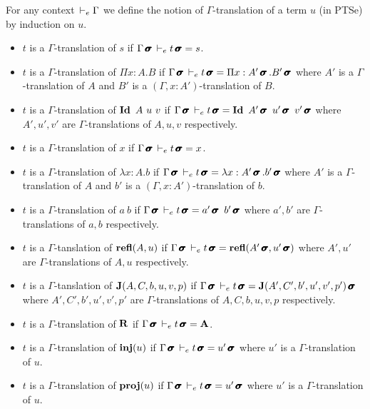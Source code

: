 \documentclass[a4paper,english]{lipics-utf8x}
\begin{document}
  \begin{definition}
    For any context $\,\vdash_e \Gamma$ we define the notion of $\Gamma$-translation
    of a term $u$ (in PTSe) by induction on $u$.
    \begin{itemize}
      \item $t$ is a $\Gamma$-translation of $s$ if
            $\Gamma \operatorname{\pmb{\bm{\sigma}}} \,\vdash_e t \operatorname{\pmb{\bm{\sigma}}} = s$.
      \item $t$ is a $\Gamma$-translation of $\Pi x:A.B$ if
            $\Gamma \operatorname{\pmb{\bm{\sigma}}} \,\vdash_e t \operatorname{\pmb{\bm{\sigma}}} = \Pi x:A'\operatorname{\pmb{\bm{\sigma}}}.B'\operatorname{\pmb{\bm{\sigma}}}$ where
            $A'$ is a $\Gamma$-translation of $A$ and $B'$ is a
            $(\Gamma, x:A')$-translation of $B$.
      \item $t$ is a $\Gamma$-translation of $\operatorname{\mathbf{Id}~} A\ u\ v$ if
            $\Gamma \msigma \dere t \msigma = \Id A'\msigma\ u'\msigma\ %
            v'\msigma$ where $A',u',v'$
            are $\Gamma$-translations of $A,u,v$ respectively.
      \item $t$ is a $\Gamma$-translation of $x$ if
            $\Gamma \operatorname{\pmb{\bm{\sigma}}} \,\vdash_e t \operatorname{\pmb{\bm{\sigma}}} = x$.
      \item $t$ is a $\Gamma$-translation of $\lambda x:A.b$ if
            $\Gamma \operatorname{\pmb{\bm{\sigma}}} \,\vdash_e t \operatorname{\pmb{\bm{\sigma}}} = \lambda x:A'\operatorname{\pmb{\bm{\sigma}}}.b'\operatorname{\pmb{\bm{\sigma}}}$
            where $A'$ is a $\Gamma$-translation of $A$ and $b'$ is a
            $(\Gamma, x:A')$-translation of $b$.
      \item $t$ is a $\Gamma$-translation of $a\ b$ if
            $\Gamma \operatorname{\pmb{\bm{\sigma}}} \,\vdash_e t \operatorname{\pmb{\bm{\sigma}}} = a'\operatorname{\pmb{\bm{\sigma}}}\ b'\operatorname{\pmb{\bm{\sigma}}}$ where
            $a',b'$ are $\Gamma$-translations of $a,b$ respectively.
      \item $t$ is a $\Gamma$-tanslation of $\operatorname{\mathbf{refl}}(A,u)$ if
            $\Gamma \operatorname{\pmb{\bm{\sigma}}} \,\vdash_e t \operatorname{\pmb{\bm{\sigma}}} = \operatorname{\mathbf{refl}}(A'\operatorname{\pmb{\bm{\sigma}}},u'\operatorname{\pmb{\bm{\sigma}}})$ where
            $A',u'$ are $\Gamma$-translations of $A,u$ respectively.
      \item \sloppy
            $t$ is a $\Gamma$-tanslation of $\operatorname{\mathbf{J}}(A,C,b,u,v,p)$ if
            $\Gamma \operatorname{\pmb{\bm{\sigma}}} \,\vdash_e t \operatorname{\pmb{\bm{\sigma}}} = \operatorname{\mathbf{J}}(A',C',b',u',v',p')\operatorname{\pmb{\bm{\sigma}}}$
            where $A',C',b',u',v',p'$ are $\Gamma$-translations of
            $A,C,b,u,v,p$ respectively.
      \item $t$ is a $\Gamma$-translation of $\operatorname{\mathbf{R}}$ if
            $\Gamma \operatorname{\pmb{\bm{\sigma}}} \,\vdash_e t \operatorname{\pmb{\bm{\sigma}}} = \operatorname{\mathbf{A}}$.
      \item $t$ is a $\Gamma$-translation of $\operatorname{\mathbf{inj}}(u)$ if
            $\Gamma \operatorname{\pmb{\bm{\sigma}}} \,\vdash_e t \operatorname{\pmb{\bm{\sigma}}} = u'\operatorname{\pmb{\bm{\sigma}}}$ where $u'$ is a
            $\Gamma$-translation of $u$.
      \item $t$ is a $\Gamma$-translation of $\operatorname{\mathbf{proj}}(u)$ if
            $\Gamma \operatorname{\pmb{\bm{\sigma}}} \,\vdash_e t \operatorname{\pmb{\bm{\sigma}}} = u'\operatorname{\pmb{\bm{\sigma}}}$ where $u'$ is a
            $\Gamma$-translation of $u$.
    \end{itemize}
  \end{definition}
\end{document}
